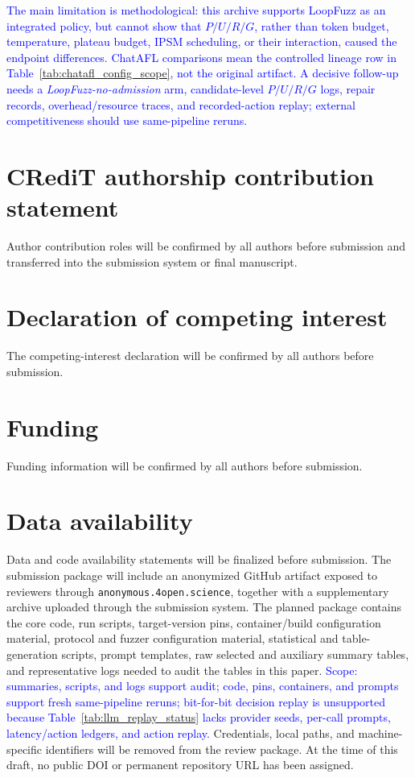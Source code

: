 \documentclass[final,5p,times,number]{elsarticle}
\begin{document}
\textcolor{blue}{The main limitation is methodological: this archive supports LoopFuzz as an integrated policy, but cannot show that $P/U/R/G$, rather than token budget, temperature, plateau budget, IPSM scheduling, or their interaction, caused the endpoint differences. ChatAFL comparisons mean the controlled lineage row in Table~\ref{tab:chatafl_config_scope}, not the original artifact. A decisive follow-up needs a \emph{LoopFuzz-no-admission} arm, candidate-level $P/U/R/G$ logs, repair records, overhead/resource traces, and recorded-action replay; external competitiveness should use same-pipeline reruns.}

\section*{CRediT authorship contribution statement}
Author contribution roles will be confirmed by all authors before submission and transferred into the submission system or final manuscript.

\section*{Declaration of competing interest}
The competing-interest declaration will be confirmed by all authors before submission.

\section*{Funding}
Funding information will be confirmed by all authors before submission.

\section*{Data availability}
Data and code availability statements will be finalized before submission. The submission package will include an anonymized GitHub artifact exposed to reviewers through \texttt{anonymous.4open.science}, together with a supplementary archive uploaded through the submission system. The planned package contains the core code, run scripts, target-version pins, container/build configuration material, protocol and fuzzer configuration material, statistical and table-generation scripts, prompt templates, raw selected and auxiliary summary tables, and representative logs needed to audit the tables in this paper. \textcolor{blue}{Scope: summaries, scripts, and logs support audit; code, pins, containers, and prompts support fresh same-pipeline reruns; bit-for-bit decision replay is unsupported because Table~\ref{tab:llm_replay_status} lacks provider seeds, per-call prompts, latency/action ledgers, and action replay.} Credentials, local paths, and machine-specific identifiers will be removed from the review package. At the time of this draft, no public DOI or permanent repository URL has been assigned.
\end{document}
